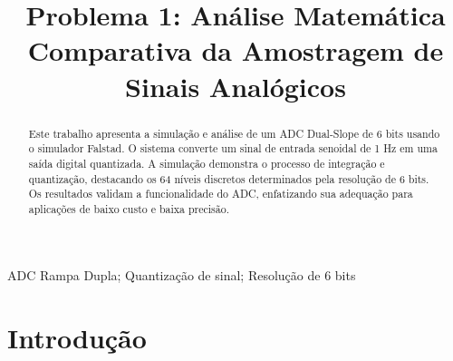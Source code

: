 \documentclass[conference]{IEEEtran}
\begin{document}
\makeatletter
\newcommand{\linebreakand}{%
    \end{@IEEEauthorhalign}
    \hfill\mbox{}\par
    \mbox{}\hfill\begin{@IEEEauthorhalign}
}
\makeatother

\title{Problema 1: Análise Matemática Comparativa da Amostragem de Sinais Analógicos\\
}

\author{
    \and
    \IEEEauthorblockN{}
    \IEEEauthorblockA{}
}

\maketitle

\begin{abstract}
    Este trabalho apresenta a simulação e análise de um ADC Dual-Slope de 6 bits usando o simulador Falstad. O sistema converte um sinal de entrada senoidal de 1 Hz em uma saída digital quantizada. A simulação demonstra o processo de integração e quantização, destacando os 64 níveis discretos determinados pela resolução de 6 bits. Os resultados validam a funcionalidade do ADC, enfatizando sua adequação para aplicações de baixo custo e baixa precisão.
\end{abstract}

\begin{IEEEkeywords}
    ADC Rampa Dupla; Quantização de sinal; Resolução de 6 bits
\end{IEEEkeywords}

\section{Introdução}

\end{document}
